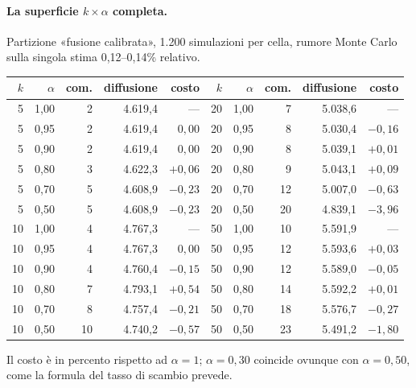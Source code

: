 \documentclass[11pt,a4paper]{article}
\begin{document}
\paragraph{La superficie $k \times \alpha$ completa.} Partizione «fusione calibrata», 1.200 simulazioni per cella, rumore Monte Carlo sulla singola stima 0,12--0,14\% relativo.
\begin{center}\small
\begin{tabular}{rrrrr@{\qquad}rrrrr}
\toprule
$k$ & $\alpha$ & com. & diffusione & costo & $k$ & $\alpha$ & com. & diffusione & costo \\
\midrule
 5 & 1,00 &  2 & 4.619,4 & —      & 20 & 1,00 &  7 & 5.038,6 & — \\
 5 & 0,95 &  2 & 4.619,4 & $0{,}00$ & 20 & 0,95 &  8 & 5.030,4 & $-0{,}16$ \\
 5 & 0,90 &  2 & 4.619,4 & $0{,}00$ & 20 & 0,90 &  8 & 5.039,1 & $+0{,}01$ \\
 5 & 0,80 &  3 & 4.622,3 & $+0{,}06$ & 20 & 0,80 & 9 & 5.043,1 & $+0{,}09$ \\
 5 & 0,70 &  5 & 4.608,9 & $-0{,}23$ & 20 & 0,70 & 12 & 5.007,0 & $-0{,}63$ \\
 5 & 0,50 &  5 & 4.608,9 & $-0{,}23$ & 20 & 0,50 & 20 & 4.839,1 & $-3{,}96$ \\
\midrule
10 & 1,00 &  4 & 4.767,3 & —      & 50 & 1,00 & 10 & 5.591,9 & — \\
10 & 0,95 &  4 & 4.767,3 & $0{,}00$ & 50 & 0,95 & 12 & 5.593,6 & $+0{,}03$ \\
10 & 0,90 &  4 & 4.760,4 & $-0{,}15$ & 50 & 0,90 & 12 & 5.589,0 & $-0{,}05$ \\
10 & 0,80 &  7 & 4.793,1 & $+0{,}54$ & 50 & 0,80 & 14 & 5.592,2 & $+0{,}01$ \\
10 & 0,70 &  8 & 4.757,4 & $-0{,}21$ & 50 & 0,70 & 18 & 5.576,7 & $-0{,}27$ \\
10 & 0,50 & 10 & 4.740,2 & $-0{,}57$ & 50 & 0,50 & 23 & 5.491,2 & $-1{,}80$ \\
\bottomrule
\end{tabular}
\end{center}
Il costo è in percento rispetto ad $\alpha = 1$; $\alpha = 0{,}30$ coincide ovunque con $\alpha = 0{,}50$, come la formula del tasso di scambio prevede.
\end{document}
